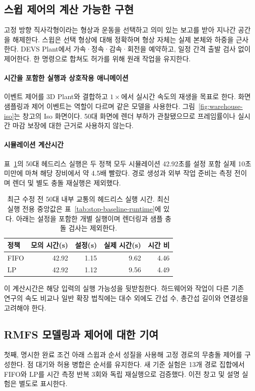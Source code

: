 \documentclass[11pt,a4paper]{article}
\theoremstyle{remark}
\begin{document}
\subsection{스윕 제어의 계산 가능한 구현}
고정 방향 직사각형이라는 형상과 운동을 선택하고 의미 있는 보고를 받아 지나간 공간을 해제한다. 스윕은 선택 형상에 대해 정확하며 형상 자체는 실제 본체와 하중을 근사한다. DEVS Plant에서 가속·정속·감속·회전을 예약하고, 일정 간격 출발 검사 없이 제어한다. 한 명령으로 합쳐도 허가를 위해 원래 작업을 유지한다.

\paragraph{시간을 포함한 실행과 상호작용 애니메이션}
이벤트 제어를 3D Plant와 결합하고 $1\times$에서 실시간 속도의 재생을 목표로 한다. 화면 샘플링과 제어 이벤트는 역할이 다르며 같은 모델을 사용한다. 그림~\ref{fig:warehouse-iso}는 창고의 Iso 화면이다. 50대 화면에 렌더 부하가 관찰됐으므로 프레임률이나 실시간 마감 보장에 대한 근거로 사용하지 않는다.

\paragraph{시뮬레이션 계산시간}
표~\ref{tab:realtime-evidence}의 50대 헤드리스 실행은 두 정책 모두 시뮬레이션 42.92초를 설정 포함 실제 10초 미만에 마쳐 해당 장비에서 약 4.5배 빨랐다. 경로 생성과 외부 작업 준비는 측정 전이며 렌더 및 별도 충돌 재실행은 제외했다.
\begin{table}[htbp]
\centering\small
\caption{최근 수정 전 50대 내부 교통의 헤드리스 실행 시간. 최신 실행 전용 중앙값은 표~\ref{tab:stop-baseline-runtime}에 있다. 아래는 설정을 포함한 개별 실행이며 렌더링과 샘플 충돌 검사는 제외한다.}
\label{tab:realtime-evidence}
\begin{tabular}{lrrrr}
\toprule
정책 & 모의 시간(s) & 설정(s) & 실제 시간(s) & 시간 비\\
\midrule
FIFO & 42.92 & 1.15 & 9.62 & 4.46\\
LP   & 42.92 & 1.12 & 9.56 & 4.49\\
\bottomrule
\end{tabular}
\end{table}
이 계산시간은 해당 입력의 실행 가능성을 뒷받침한다. 하드웨어와 작업이 다른 기존 연구의 속도 비교나 일반 확장 법칙에는 대수 외에도 간섭 수, 총간섭 길이와 연결성을 고려해야 한다.

\subsection{RMFS 모델링과 제어에 대한 기여}
첫째, 명시한 완료 조건 아래 스윕과 순서 성질을 사용해 고정 경로의 무충돌 제어를 구성한다. 점 대기와 허용 병합은 순서를 유지한다. 새 기준 실험은 13개 경로 집합에서 FIFO와 LP를 시간 측정 반복 3회와 독립 재실행으로 검증했다. 이전 창고 및 설명 실험은 별도로 표시한다.
\end{document}
